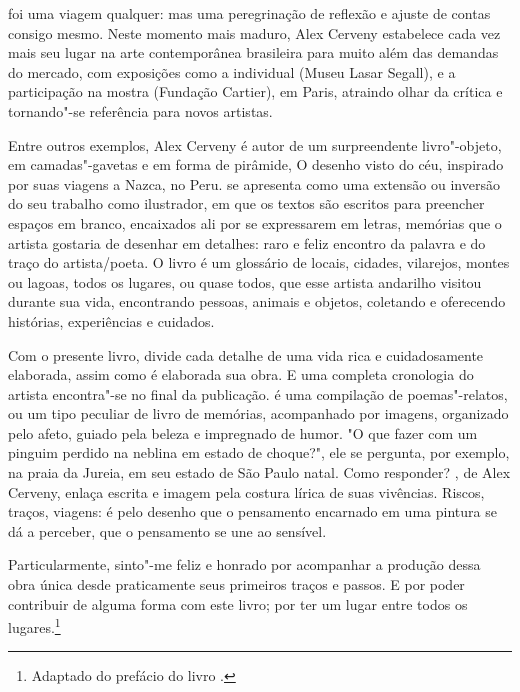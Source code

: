 \begin{multicols}{2}
{}

\bigskip

\noindent{}foi uma viagem qualquer: mas uma peregrinação de reflexão e ajuste de contas consigo mesmo. Neste momento mais maduro, Alex Cerveny estabelece cada vez mais seu lugar na arte contemporânea brasileira para muito além das demandas do mercado, com exposições como a individual {} (Museu Lasar Segall), e a participação na mostra {} (Fundação Cartier), em Paris, atraindo olhar da crítica e tornando"-se referência para novos artistas. 

Entre outros exemplos, Alex Cerveny é autor de um surpreendente livro"-objeto, em camadas"-gavetas e em forma de pirâmide, O desenho visto do céu, inspirado por suas viagens a Nazca, no Peru. {} se apresenta como uma extensão ou inversão do seu trabalho como ilustrador, em que os textos são escritos para preencher espaços em branco, encaixados ali por se expressarem em letras, memórias que o artista gostaria de desenhar em detalhes: raro e feliz encontro da palavra e do traço do artista/poeta. O livro é um glossário de locais, cidades, vilarejos, montes ou lagoas, todos os lugares, ou quase todos, que esse artista andarilho visitou durante sua vida, encontrando pessoas, animais e objetos, coletando e oferecendo histórias, experiências e cuidados. 

Com o presente livro, divide cada
detalhe de uma vida rica e cuidadosamente elaborada, assim como é elaborada sua obra. E uma completa cronologia do artista encontra"-se no final da publicação. {} é uma compilação de poemas"-relatos, ou um tipo peculiar de livro de memórias, acompanhado por imagens, organizado pelo afeto, guiado pela beleza e impregnado de humor. "O que fazer com um pinguim perdido na neblina em estado de choque?", ele se pergunta, por exemplo, na praia da Jureia, em seu estado de São Paulo natal. Como responder? {}, de Alex Cerveny, enlaça escrita e imagem pela costura lírica de suas vivências. Riscos, traços, viagens: é pelo desenho que o pensamento encarnado em uma pintura se dá a perceber, que o pensamento se une ao sensível. 

Particularmente, sinto"-me feliz e honrado por acompanhar a produção dessa obra única desde praticamente seus primeiros traços e passos. E por poder contribuir de alguma forma com este livro; por ter um lugar entre todos os lugares.\footnote[1]{Adaptado do prefácio do livro {}.} \enlargethispage{\baselineskip}
\end{multicols}

